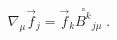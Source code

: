 \begin{equation}
\nabla_{\mu}\vec{f}_{j}=\vec{f}_{k}\stackrel{\circ}{B^{k}}_{j\mu}\;.
\end{equation}


